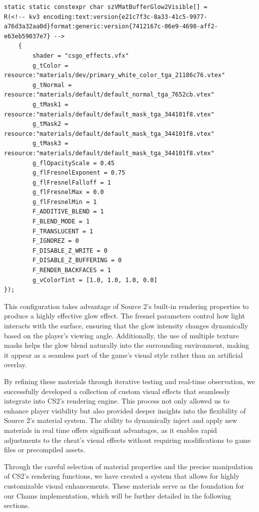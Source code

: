 \begin{lstlisting}[style=cppstyle, caption={Glow Illuminated Material Definition}] 
static static constexpr char szVMatBufferGlow2Visible[] =
R(<!-- kv3 encoding:text:version{e21c7f3c-8a33-41c5-9977-a76d3a32aa0d}format:generic:version{7412167c-06e9-4698-aff2-e63eb59037e7} -->
    {
        shader = "csgo_effects.vfx"
        g_tColor = resource:"materials/dev/primary_white_color_tga_21186c76.vtex"
        g_tNormal = resource:"materials/default/default_normal_tga_7652cb.vtex"
        g_tMask1 = resource:"materials/default/default_mask_tga_344101f8.vtex"
        g_tMask2 = resource:"materials/default/default_mask_tga_344101f8.vtex"
        g_tMask3 = resource:"materials/default/default_mask_tga_344101f8.vtex"
        g_flOpacityScale = 0.45
        g_flFresnelExponent = 0.75
        g_flFresnelFalloff = 1
        g_flFresnelMax = 0.0
        g_flFresnelMin = 1
        F_ADDITIVE_BLEND = 1
        F_BLEND_MODE = 1	
        F_TRANSLUCENT = 1
        F_IGNOREZ = 0
        F_DISABLE_Z_WRITE = 0
        F_DISABLE_Z_BUFFERING = 0
        F_RENDER_BACKFACES = 1
        g_vColorTint = [1.0, 1.0, 1.0, 0.0]
});
\end{lstlisting}


This configuration takes advantage of Source 2’s built-in rendering properties to produce a highly effective glow effect. The fresnel parameters control how light interacts with the surface, ensuring that the glow intensity changes dynamically based on the player's viewing angle. Additionally, the use of multiple texture masks helps the glow blend naturally into the surrounding environment, making it appear as a seamless part of the game's visual style rather than an artificial overlay.

By refining these materials through iterative testing and real-time observation, we successfully developed a collection of custom visual effects that seamlessly integrate into CS2’s rendering engine. This process not only allowed us to enhance player visibility but also provided deeper insights into the flexibility of Source 2’s material system. The ability to dynamically inject and apply new materials in real time offers significant advantages, as it enables rapid adjustments to the cheat’s visual effects without requiring modifications to game files or precompiled assets.

Through the careful selection of material properties and the precise manipulation of CS2’s rendering functions, we have created a system that allows for highly customizable visual enhancements. These materials serve as the foundation for our Chams implementation, which will be further detailed in the following sections.


